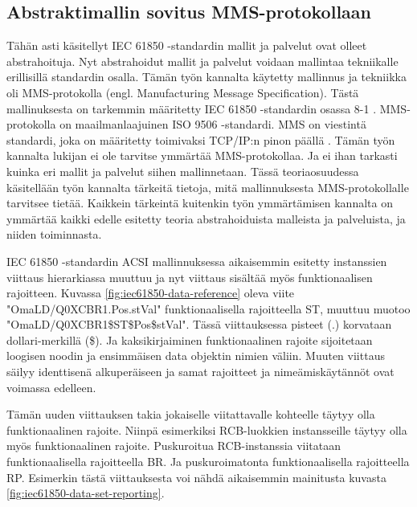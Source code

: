 \subsection{Abstraktimallin sovitus MMS-protokollaan}
Tähän asti käsitellyt IEC 61850 -standardin mallit ja palvelut ovat olleet abstrahoituja. Nyt abstrahoidut mallit ja palvelut voidaan mallintaa tekniikalle erillisillä standardin osalla. Tämän työn kannalta käytetty mallinnus ja tekniikka oli MMS-protokolla (engl. Manufacturing Message Specification). Tästä mallinuksesta on tarkemmin määritetty IEC 61850 -standardin osassa 8-1 \cite{IEC61850-8-1}. MMS-protokolla on maailmanlaajuinen ISO 9506 -standardi. MMS on viestintä standardi, joka on määritetty toimivaksi TCP/IP:n pinon päällä \cite{MMS-protocol-stack-and-API}. Tämän työn kannalta lukijan ei ole tarvitse ymmärtää MMS-protokollaa. Ja ei ihan tarkasti kuinka eri mallit ja palvelut siihen mallinnetaan. Tässä teoriaosuudessa käsitellään työn kannalta tärkeitä tietoja, mitä mallinnuksesta MMS-protokollalle tarvitsee tietää. Kaikkein tärkeintä kuitenkin työn ymmärtämisen kannalta on ymmärtää kaikki edelle esitetty teoria abstrahoiduista malleista ja palveluista, ja niiden toiminnasta. \cite{Introduction-to-the-MMS}

IEC 61850 -standardin ACSI mallinnuksessa aikaisemmin esitetty instanssien viittaus hierarkiassa muuttuu ja nyt viittaus sisältää myös funktionaalisen rajoitteen. Kuvassa \ref{fig:iec61850-data-reference} oleva viite "OmaLD/Q0XCBR1.Pos.stVal" funktionaalisella rajoitteella ST, muuttuu muotoo "OmaLD/Q0XCBR1\$ST\$Pos\$stVal". Tässä viittauksessa pisteet (.) korvataan dollari-merkillä (\$). Ja kaksikirjaiminen funktionaalinen rajoite sijoitetaan loogisen noodin ja ensimmäisen data objektin nimien väliin. Muuten viittaus säilyy identtisenä alkuperäiseen ja samat rajoitteet ja nimeämiskäytännöt ovat voimassa edelleen. \cite[s.~34--35, 111]{IEC61850-8-1}

Tämän uuden viittauksen takia jokaiselle viitattavalle kohteelle täytyy olla funktionaalinen rajoite. Niinpä esimerkiksi RCB-luokkien instansseille täytyy olla myös funktionaalinen rajoite. Puskuroitua RCB-instanssia viitataan funktionaalisella rajoitteella BR. Ja puskuroimatonta funktionaalisella rajoitteella RP. Esimerkin tästä viittauksesta voi nähdä aikaisemmin mainitusta kuvasta \ref{fig:iec61850-data-set-reporting}. \cite[s.~32--34, 75]{IEC61850-8-1}


